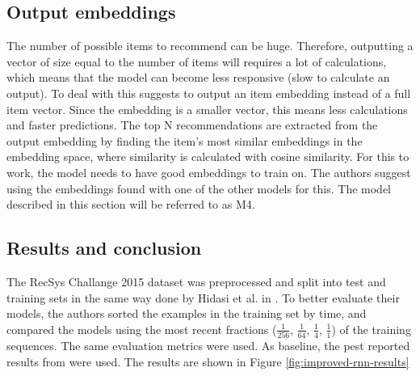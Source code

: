 \subsection{Output embeddings}
The number of possible items to recommend can be huge. Therefore, outputting a vector of size equal to the number of items will requires a lot of calculations, which means that the model can become less responsive (slow to calculate an output). To deal with this \cite{DBLP:journals/corr/TanXL16} suggests to output an item embedding instead of a full item vector. Since the embedding is a smaller vector, this means less calculations and faster predictions. The top N recommendations are extracted from the output embedding by finding the item's most similar embeddings in the embedding space, where similarity is calculated with cosine similarity. For this to work, the model needs to have good embeddings to train on. The authors suggest using the embeddings found with one of the other models for this. The model described in this section will be referred to as M4.

\subsection{Results and conclusion}
The RecSys Challange 2015 dataset was preprocessed and split into test and training sets in the same way done by Hidasi et al. in \cite{DBLP:journals/corr/HidasiKBT15}. To better evaluate their models, the authors sorted the examples in the training set by time, and compared the models using the most recent fractions ($\frac{1}{256}$, $\frac{1}{64}$, $\frac{1}{4}$, $\frac{1}{1}$) of the training sequences. The same evaluation metrics were used. As baseline, the pest reported results from \cite{DBLP:journals/corr/HidasiKBT15} were used. The results are shown in Figure \ref{fig:improved-rnn-results}

